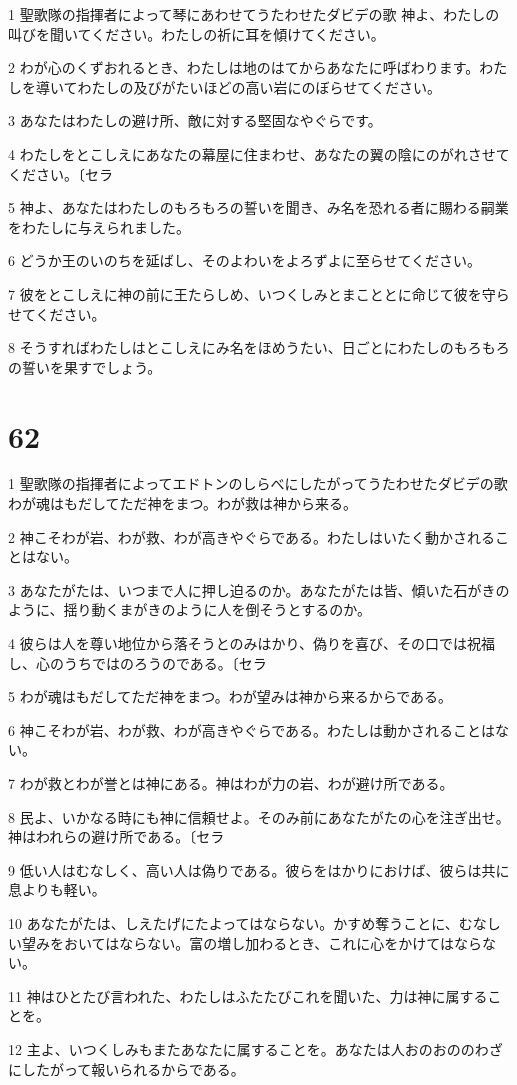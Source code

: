 \par 1 聖歌隊の指揮者によって琴にあわせてうたわせたダビデの歌 神よ、わたしの叫びを聞いてください。わたしの祈に耳を傾けてください。
\par 2 わが心のくずおれるとき、わたしは地のはてからあなたに呼ばわります。わたしを導いてわたしの及びがたいほどの高い岩にのぼらせてください。
\par 3 あなたはわたしの避け所、敵に対する堅固なやぐらです。
\par 4 わたしをとこしえにあなたの幕屋に住まわせ、あなたの翼の陰にのがれさせてください。〔セラ
\par 5 神よ、あなたはわたしのもろもろの誓いを聞き、み名を恐れる者に賜わる嗣業をわたしに与えられました。
\par 6 どうか王のいのちを延ばし、そのよわいをよろずよに至らせてください。
\par 7 彼をとこしえに神の前に王たらしめ、いつくしみとまこととに命じて彼を守らせてください。
\par 8 そうすればわたしはとこしえにみ名をほめうたい、日ごとにわたしのもろもろの誓いを果すでしょう。

\chapter{62}

\par 1 聖歌隊の指揮者によってエドトンのしらべにしたがってうたわせたダビデの歌 わが魂はもだしてただ神をまつ。わが救は神から来る。
\par 2 神こそわが岩、わが救、わが高きやぐらである。わたしはいたく動かされることはない。
\par 3 あなたがたは、いつまで人に押し迫るのか。あなたがたは皆、傾いた石がきのように、揺り動くまがきのように人を倒そうとするのか。
\par 4 彼らは人を尊い地位から落そうとのみはかり、偽りを喜び、その口では祝福し、心のうちではのろうのである。〔セラ
\par 5 わが魂はもだしてただ神をまつ。わが望みは神から来るからである。
\par 6 神こそわが岩、わが救、わが高きやぐらである。わたしは動かされることはない。
\par 7 わが救とわが誉とは神にある。神はわが力の岩、わが避け所である。
\par 8 民よ、いかなる時にも神に信頼せよ。そのみ前にあなたがたの心を注ぎ出せ。神はわれらの避け所である。〔セラ
\par 9 低い人はむなしく、高い人は偽りである。彼らをはかりにおけば、彼らは共に息よりも軽い。
\par 10 あなたがたは、しえたげにたよってはならない。かすめ奪うことに、むなしい望みをおいてはならない。富の増し加わるとき、これに心をかけてはならない。
\par 11 神はひとたび言われた、わたしはふたたびこれを聞いた、力は神に属することを。
\par 12 主よ、いつくしみもまたあなたに属することを。あなたは人おのおののわざにしたがって報いられるからである。

